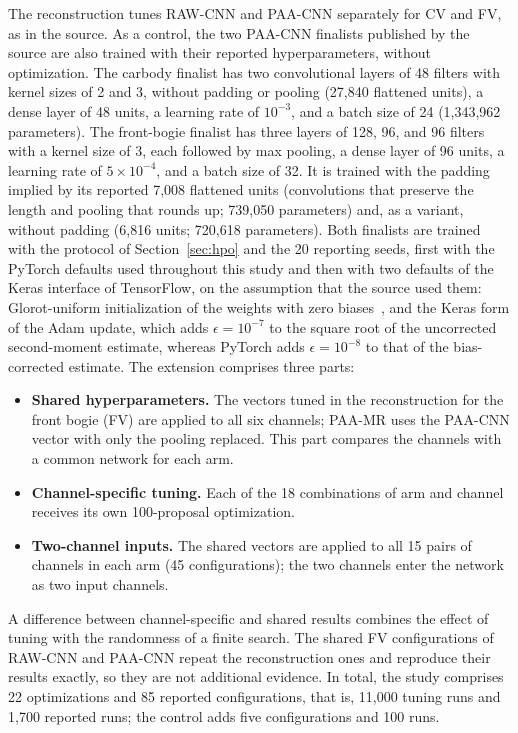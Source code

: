 The reconstruction tunes RAW-CNN and PAA-CNN separately for CV and FV, as in
the source. As a control, the two PAA-CNN finalists published by the source are
also trained with their reported hyperparameters, without optimization. The
carbody finalist has two convolutional layers of 48 filters with kernel sizes
of 2 and 3, without padding or pooling (27,840 flattened units), a dense layer
of 48 units, a learning rate of $10^{-3}$, and a batch size of 24 (1,343,962
parameters). The front-bogie finalist has three layers of 128, 96, and 96
filters with a kernel size of 3, each followed by max pooling, a dense layer of
96 units, a learning rate of $5\times10^{-4}$, and a batch size of 32. It is
trained with the padding implied by its reported 7,008 flattened units
(convolutions that preserve the length and pooling that rounds up; 739,050
parameters) and, as a variant, without padding (6,816 units; 720,618
parameters). Both finalists are trained with the protocol of
Section~\ref{sec:hpo} and the 20 reporting seeds, first with the PyTorch
defaults used throughout this study and then with two defaults of the Keras
interface of TensorFlow, on the assumption that the source used them:
Glorot-uniform initialization of the weights with zero
biases~\cite{glorot2010understanding}, and the Keras form of the Adam update,
which adds $\epsilon=10^{-7}$ to the square root of the uncorrected
second-moment estimate, whereas PyTorch adds $\epsilon=10^{-8}$ to that of the
bias-corrected estimate. The extension comprises three parts:
\begin{itemize}
  \item \textbf{Shared hyperparameters.} The vectors tuned in the
  reconstruction for the front bogie (FV) are applied to all six channels;
  PAA-MR uses the PAA-CNN vector with only the pooling replaced. This part
  compares the channels with a common network for each arm.
  \item \textbf{Channel-specific tuning.} Each of the 18 combinations of arm and
  channel receives its own 100-proposal optimization.
  \item \textbf{Two-channel inputs.} The shared vectors are applied to all 15
  pairs of channels in each arm (45 configurations); the two channels enter the
  network as two input channels.
\end{itemize}
A difference between channel-specific and shared results combines the effect
of tuning with the randomness of a finite search. The shared FV configurations
of RAW-CNN and PAA-CNN repeat the reconstruction ones and reproduce their
results exactly, so they are not additional evidence. In total, the study
comprises 22 optimizations and 85 reported configurations, that is, 11,000
tuning runs and 1,700 reported runs; the control adds five configurations and
100 runs.


